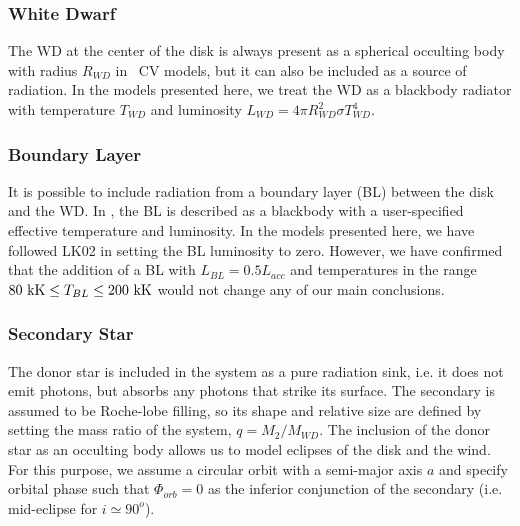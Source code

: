 \documentclass[preprint, a4paper, 11pt]{aastex}
\begin{document}
\subsubsection{White Dwarf}

The WD at the center of the disk is always present as a spherical occulting
body with radius $R_{WD}$ in \py\ CV models, but it can also be included
as a source of radiation. In the models presented here, we treat the
WD as a blackbody radiator with temperature $T_{WD}$ and luminosity
$L_{WD} = 4\pi R_{WD}^2 \sigma T_{WD}^4$. 

\subsubsection{Boundary Layer}

It is possible to include radiation from a boundary layer (BL) between
the disk and the WD. In \py, the BL is described as
a blackbody with a user-specified effective temperature and
luminosity. In the models presented here, we have followed LK02 in setting
the BL luminosity to zero. However, we have confirmed that the addition of a
BL with $L_{BL} = 0.5 L_{acc}$ and temperatures in the range $80~{\rm
kK} \leq T_{BL} \leq 200~{\rm kK}$ would not change any of our main
conclusions. 

\subsubsection{Secondary Star}

The donor star is included in the system as a pure radiation sink, 
i.e. it does not emit photons, but absorbs any photons that strike its
surface. The secondary is assumed to be Roche-lobe filling, so its
shape and relative size are defined by setting the mass ratio of the system, 
$q = M_2/M_{WD}$. The inclusion of the donor star as an occulting body
allows us to model eclipses of the disk and the wind. For this
purpose, we assume a circular orbit with a semi-major axis $a$ and 
specify orbital phase such that $\Phi_{orb} = 0$ as the
inferior conjunction of the secondary (i.e. mid-eclipse for $i \simeq
90^o$).

\end{document}

